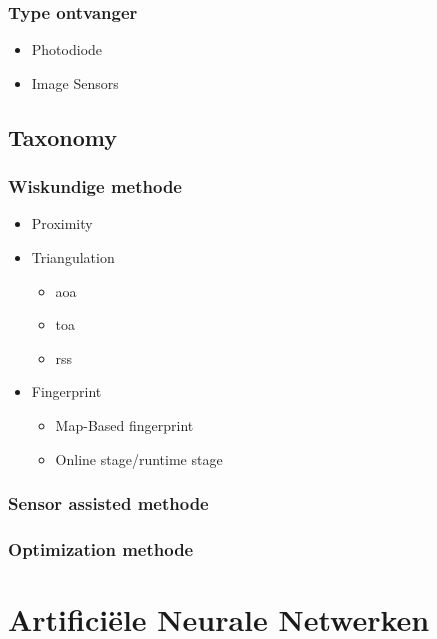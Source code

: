 		\subsubsection{Type ontvanger}
			\begin{itemize}
				\item Photodiode
				\item Image Sensors
			\end{itemize}
	\subsection{Taxonomy}
		\subsubsection{Wiskundige methode}
			\begin{itemize}
				\item Proximity
				\item Triangulation
					\begin{itemize}
						\item \acrfull{aoa}
						\item \acrfull{toa}
						\item \acrfull{rss}
					\end{itemize}
				\item Fingerprint
					\begin{itemize}
						\item Map-Based fingerprint
						\item Online stage/runtime stage
					\end{itemize}
			\end{itemize}
		\subsubsection{Sensor assisted methode}
		\subsubsection{Optimization methode}
\section{Artifici\"ele Neurale Netwerken}

